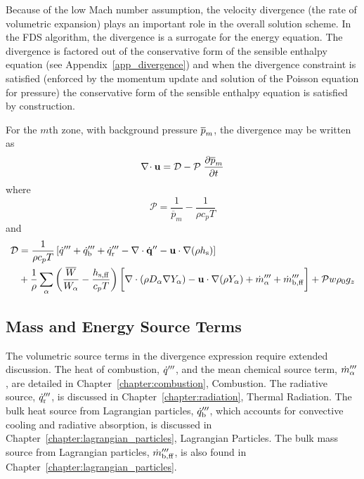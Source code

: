 Because of the low Mach number assumption, the velocity divergence (the rate of volumetric expansion) plays an important role in the overall solution scheme.  In the FDS algorithm, the divergence is a surrogate for the energy equation.  The divergence is factored out of the conservative form of the sensible enthalpy equation (see Appendix~\ref{app_divergence}) and when the divergence constraint is satisfied (enforced by the momentum update and solution of the Poisson equation for pressure) the conservative form of the sensible enthalpy equation is satisfied by construction.

For the $m$th zone, with background pressure $\overline{p}_m$, the divergence may be written as
\begin{equation}
\label{eqn_divfromeos}
\nabla\!\cdot {\bf u} = {\cal D} - {\cal P}\; \frac{\partial \overline{p}_m}{\partial t}
\end{equation}
where
\begin{equation}
\label{eqn_fdsP1}
\mathcal{P} = \frac{1}{\overline{p}_m} - \frac{1}{\rho c_p T}
\end{equation}
and
\begin{align}
\label{eqn_fdsD1}
\mathcal{D} &= \frac{1}{\rho c_p T}\left[ \dot{q}^{\prime\prime\prime} + \dot{q}_{\rm b}^{\prime\prime\prime} + \dot{q}_{\rm r}^{\prime\prime\prime} - \nabla\cdot \dot{\mathbf{q}}^{\prime\prime} - \mathbf{u} \cdot\nabla (\rho h_{\rm s}) \right] \notag\\
&+ \frac{1}{\rho} \sum_\alpha \left(\frac{\overline{W}}{W_\alpha} - \frac{h_{\rm s,\alpha}}{c_p T} \right) \bigg[ \nabla\cdot (\rho D_\alpha \nabla Y_\alpha) - \mathbf{u} \cdot \nabla (\rho Y_\alpha) +\dot{m}_\alpha^{\prime\prime\prime} + \dot{m}_{\rm b,\alpha}^{\prime\prime\prime} \bigg] + {\cal P} w \rho_0 g_z
\end{align}

\subsection{Mass and Energy Source Terms}
\label{div_source_terms}

The volumetric source terms in the divergence expression require extended discussion.  The heat of combustion, $\dot{q}^{\prime\prime\prime}$, and the mean chemical source term, $\dot{m}_\alpha^{\prime\prime\prime}$, are detailed in Chapter~\ref{chapter:combustion}, Combustion.    The radiative source, $\dot{q}_{\rm r}^{\prime\prime\prime}$, is discussed in Chapter~\ref{chapter:radiation}, Thermal Radiation.  The bulk heat source from Lagrangian particles, $\dot{q}_{\rm b}^{\prime\prime\prime}$, which accounts for convective cooling and radiative absorption, is discussed in Chapter~\ref{chapter:lagrangian_particles}, Lagrangian Particles.  The bulk mass source from Lagrangian particles, $\dot{m}_{\rm b,\alpha}^{\prime\prime\prime}$, is also found in Chapter~\ref{chapter:lagrangian_particles}.

